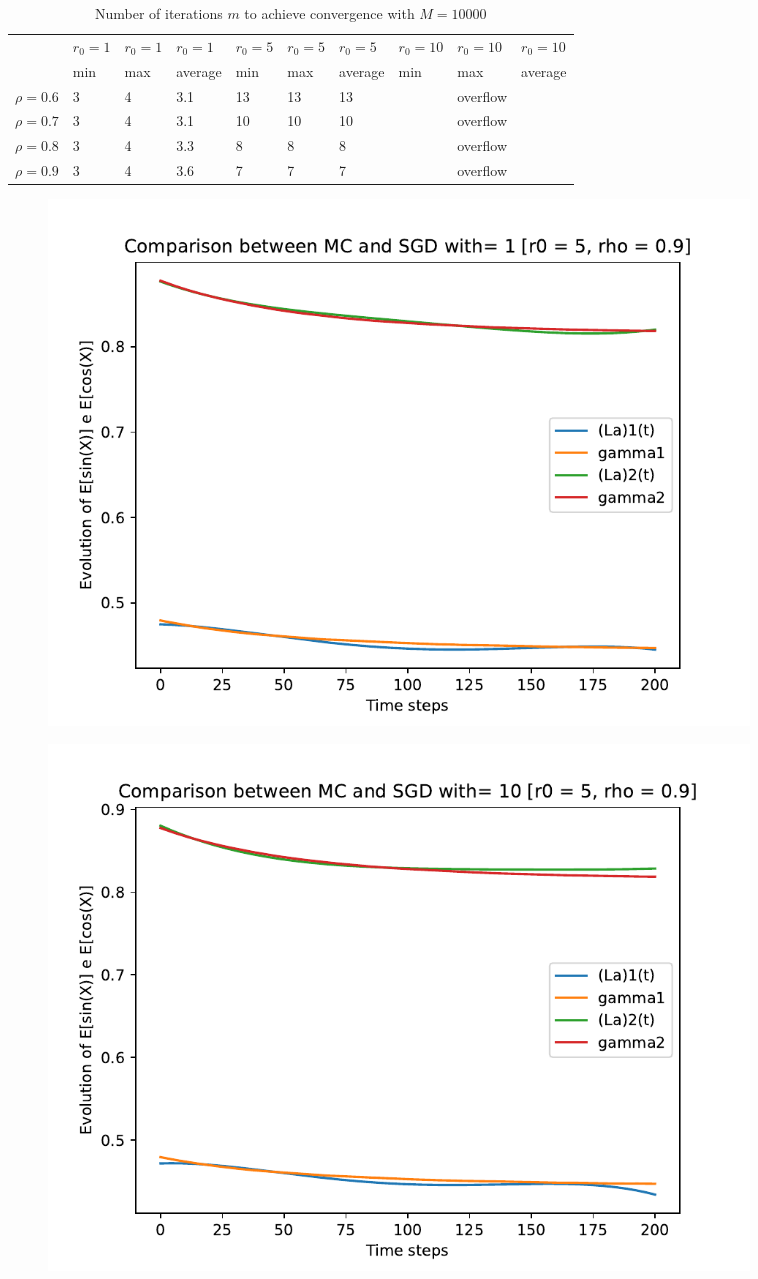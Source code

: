 \documentclass[a4paper,11pt,openright]{report}
\begin{document}
\begin{table}[H]
\centering
\addtolength{\leftskip}{-1.5cm}
\addtolength{\rightskip}{-1.5cm}
\begin{tabular}{|c|lllllllll|}
\hline
$ $ & $r_0 = 1$ & $r_0 = 1$ & $r_0 = 1$ & $r_0 = 5$ & $r_0 = 5$ & $r_0 = 5$ & $r_0 = 10$ & $r_0 = 10$ & $r_0 = 10$  \\
$ $ & min & max & average & min & max & average & min & max & average \\ 
\hline
$\rho = 0.6$ & 3 & 4 & 3.1 & 13 & 13 & 13 &  & overflow &  \\

$\rho = 0.7$ & 3 & 4 & 3.1 & 10 & 10 & 10 &  & overflow &  \\

$\rho = 0.8$ & 3 & 4 & 3.3 & 8 & 8 & 8 &  & overflow & \\

$\rho = 0.9$ & 3 & 4 & 3.6 & 7 & 7 & 7 &  & overflow & \\
\hline
\end{tabular}
\caption{Number of iterations $m$ to achieve convergence with $M = 10000$}
\end{table}
\begin{figure}[H]
\centering
\includegraphics[width=0.9\textwidth]{images/graphics T = 2/n = 4, M = 1 sine and cosine.pdf}
\end{figure}
\begin{figure}[H]
\centering
\includegraphics[width=0.9\textwidth]{images/graphics T = 2/n = 4, M = 10 sine and cosine.pdf}
\end{figure}
\end{document}
